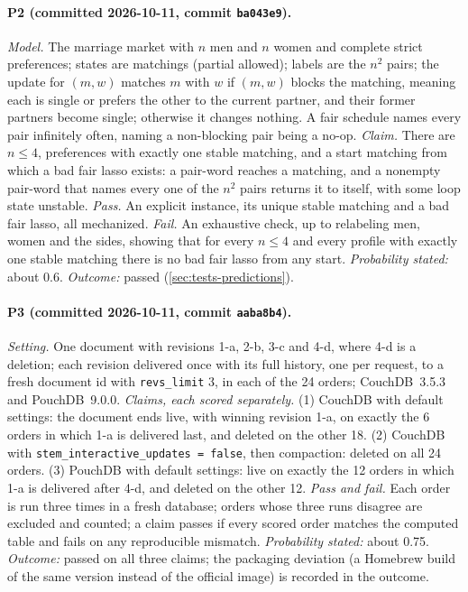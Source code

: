 \paragraph{P2 (committed 2026-10-11, commit \texttt{ba043e9}).} \emph{Model.} The marriage market with
$n$ men and $n$ women and complete strict preferences; states are matchings (partial allowed); labels
are the $n^2$ pairs; the update for $(m, w)$ matches $m$ with $w$ if $(m, w)$ blocks the matching,
meaning each is single or prefers the other to the current partner, and their former partners become
single; otherwise it changes nothing. A fair schedule names every pair infinitely often, naming a
non-blocking pair being a no-op. \emph{Claim.} There are $n \le 4$, preferences with exactly one stable
matching, and a start matching from which a bad fair lasso exists: a pair-word reaches a matching, and a
nonempty pair-word that names every one of the $n^2$ pairs returns it to itself, with some loop state
unstable. \emph{Pass.} An explicit instance, its unique stable matching and a bad fair lasso, all
mechanized. \emph{Fail.} An exhaustive check, up to relabeling men, women and the sides, showing that for every $n \le 4$ and every
profile with exactly one stable matching there is no bad fair lasso from any start. \emph{Probability
stated:} about 0.6. \emph{Outcome:} passed (\cref{sec:tests-predictions}).

\paragraph{P3 (committed 2026-10-11, commit \texttt{aaba8b4}).} \emph{Setting.} One document with
revisions 1-a, 2-b, 3-c and 4-d, where 4-d is a deletion; each revision delivered once with its full
history, one per request, to a fresh document id with \texttt{revs\_limit} 3, in each of the 24 orders;
CouchDB~3.5.3 and PouchDB~9.0.0. \emph{Claims, each scored separately.} (1) CouchDB with default
settings: the document ends live, with winning revision 1-a, on exactly the 6 orders in which 1-a is
delivered last, and deleted on the other 18. (2) CouchDB with \texttt{stem\_interactive\_updates =
false}, then compaction: deleted on all 24 orders. (3) PouchDB with default settings: live on exactly
the 12 orders in which 1-a is delivered after 4-d, and deleted on the other 12. \emph{Pass and fail.}
Each order is run three times in a fresh database; orders whose three runs disagree are excluded and
counted; a claim passes if every scored order matches the computed table and fails on any reproducible
mismatch. \emph{Probability stated:} about 0.75.
\emph{Outcome:} passed on all three claims; the packaging deviation (a Homebrew build of the same
version instead of the official image) is recorded in the outcome.
